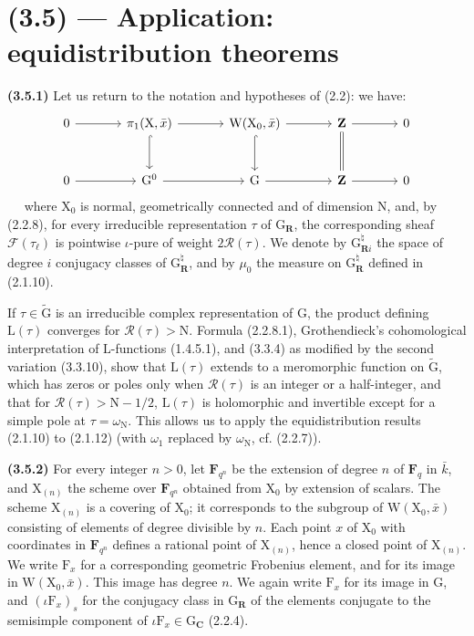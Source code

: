 \documentclass[11pt,leqno]{article}
\newcommand{\Page}[1]{\ifvmode\noindent\else\unskip\ \fi{\footnotesize\textcolor{gray}{[p.\,#1]}}\ \ignorespaces}
\begin{document}
\section*{(3.5) — Application: equidistribution theorems}

\textbf{(3.5.1)} Let us return to the notation and hypotheses of (2.2): we have:
\[
\begin{tikzcd}[column sep=large,row sep=large]
0 \arrow[r] &
\pi_1(\mathrm X,\bar x) \arrow[r] \arrow[d,hook] &
\mathrm W(\mathrm X_0,\bar x) \arrow[r] \arrow[d,hook] &
\mathbf Z \arrow[r] \arrow[d,equal] & 0 \\
0 \arrow[r] &
\mathrm G^0 \arrow[r] &
\mathrm G \arrow[r] &
\mathbf Z \arrow[r] & 0
\end{tikzcd}
\]
\Page{211}
where \(\mathrm X_0\) is normal, geometrically connected and of dimension \(\mathrm N\), and, by (2.2.8), for every irreducible representation \(\tau\) of \(\mathrm G_{\mathbf R}\), the corresponding sheaf \(\mathscr F(\tau_\ell)\) is pointwise \(\iota\)-pure of weight \(2\mathscr R(\tau)\). We denote by \(\mathrm G_{\mathbf R i}^{\natural}\) the space of degree \(i\) conjugacy classes of \(\mathrm G_{\mathbf R}^{\natural}\), and by \(\mu_0\) the measure on \(\mathrm G_{\mathbf R}^{\natural}\) defined in (2.1.10).

If \(\tau\in\widetilde{\mathrm G}\) is an irreducible complex representation of \(\mathrm G\), the product defining \(\mathrm L(\tau)\) converges for \(\mathscr R(\tau)>\mathrm N\). Formula (2.2.8.1), Grothendieck's cohomological interpretation of \(\mathrm L\)-functions (1.4.5.1), and (3.3.4) as modified by the second variation (3.3.10), show that \(\mathrm L(\tau)\) extends to a meromorphic function on \(\widetilde{\mathrm G}\), which has zeros or poles only when \(\mathscr R(\tau)\) is an integer or a half-integer, and that for \(\mathscr R(\tau)>\mathrm N-1/2\), \(\mathrm L(\tau)\) is holomorphic and invertible except for a simple pole at \(\tau=\omega_{\mathrm N}\). This allows us to apply the equidistribution results (2.1.10) to (2.1.12) (with \(\omega_1\) replaced by \(\omega_{\mathrm N}\), cf. (2.2.7)).

\textbf{(3.5.2)} For every integer \(n>0\), let \(\mathbf F_{q^n}\) be the extension of degree \(n\) of \(\mathbf F_q\) in \(\bar k\), and \(\mathrm X_{(n)}\) the scheme over \(\mathbf F_{q^n}\) obtained from \(\mathrm X_0\) by extension of scalars. The scheme \(\mathrm X_{(n)}\) is a covering of \(\mathrm X_0\); it corresponds to the subgroup of \(\mathrm W(\mathrm X_0,\bar x)\) consisting of elements of degree divisible by \(n\). Each point \(x\) of \(\mathrm X_0\) with coordinates in \(\mathbf F_{q^n}\) defines a rational point of \(\mathrm X_{(n)}\), hence a closed point of \(\mathrm X_{(n)}\). We write \(\mathrm F_x\) for a corresponding geometric Frobenius element, and for its image in \(\mathrm W(\mathrm X_0,\bar x)\). This image has degree \(n\). We again write \(\mathrm F_x\) for its image in \(\mathrm G\), and \((\iota\mathrm F_x)_s\) for the conjugacy class in \(\mathrm G_{\mathbf R}\) of the elements conjugate to the semisimple component of \(\iota\mathrm F_x\in\mathrm G_{\mathbf C}\) (2.2.4).
\end{document}
